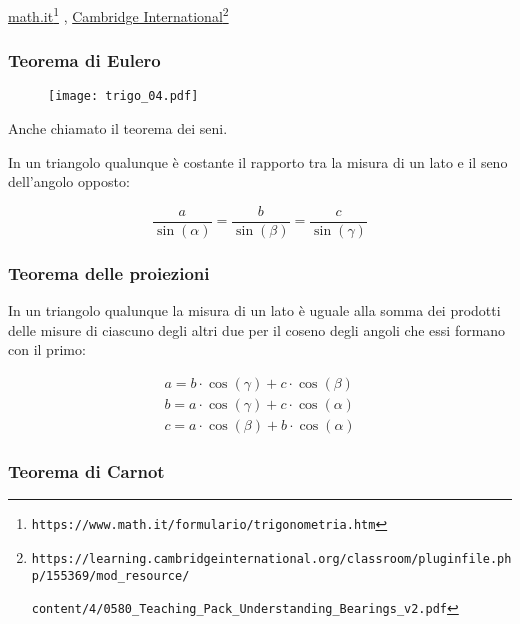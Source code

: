 \href{https://www.math.it/formulario/trigonometria.htm}{math.it}\footnote{\texttt{https://www.math.it/formulario/trigonometria.htm}}
, \href{https://learning.cambridgeinternational.org/classroom/pluginfile.php/155369/mod\_resource/content/4/0580\_Teaching\_Pack\_Understanding\_Bearings\_v2.pdf}{Cambridge International}\footnote{\texttt{https://learning.cambridgeinternational.org/classroom/pluginfile.php/155369/mod\_resource/}

\texttt{content/4/0580\_Teaching\_Pack\_Understanding\_Bearings\_v2.pdf}}


\subsubsection{Teorema di Eulero}\label{subs_euler}

\begin{figure}[H]
\centering
\texttt{[image: trigo\_04.pdf]}
\end{figure}




Anche chiamato il teorema dei seni.

In un triangolo qualunque è costante il rapporto tra la misura di un lato e il seno dell’angolo opposto:


\begin{equation}
\frac{a}{\sin (\alpha)} = \frac{b}{\sin (\beta)} = \frac{c}{\sin (\gamma)}
\end{equation}

\subsubsection{Teorema delle proiezioni}

In un triangolo qualunque la misura di un lato è uguale alla somma dei prodotti delle misure di ciascuno 
degli altri due per il coseno degli angoli che essi formano con il primo:

\begin{equation}
\begin{array}{ll}
a=b\cdot \cos (\gamma) + c\cdot \cos (\beta)  \\
b=a\cdot \cos (\gamma) + c\cdot \cos (\alpha)  \\
c=a\cdot \cos (\beta) + b\cdot \cos (\alpha) 
\end{array}
\end{equation}

\subsubsection{Teorema di Carnot}\label{subs_carnot}

